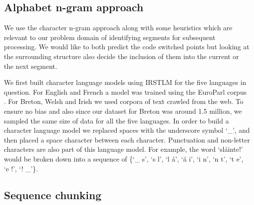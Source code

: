 \documentclass[11pt]{article}
\begin{document}
\subsection{Alphabet n-gram approach}
\vspace{-0.152cm}
\label{alphan}

We use the character n-gram approach along with some heuristics which are relevant to our problem domain of identifying
segments for subsequent processing. We would like 
to both predict the code switched points but looking at the surrounding structure also decide the inclusion of them 
into the current or the next segment.

We first built character language models using IRSTLM \cite{federico08a} for the five languages in question. For English
and French a model was trained using the EuroParl corpus \cite{koehn2005europarl}. 
For Breton, Welsh and Irish we used corpora of text crawled from the web. To ensure no bias and also since our dataset for Breton was around 1.5 million, we sampled the same size of data for all the five languages. 
In order to build a character language model %
we replaced spaces with the underscore 
symbol `\_', and then placed a space character between each character. Punctuation and non-letter characters are also 
part of this language model. For example, the word `sl\'{a}inte!' would be broken down into a sequence 
of \{`\_ s', `s l', `l \'{a}', `\'{a} i', `i n', `n t', `t e', `e !', `! \_'\}. 


\subsection{Sequence chunking}
\vspace{-0.152cm}
\label{cschunking}
\end{document}
